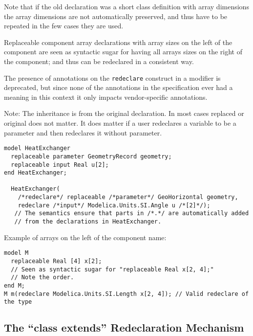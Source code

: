 Note that if the old declaration was a short class definition with array dimensions the array dimensions are not automatically preserved, and thus have to be repeated in the few cases they are used.

Replaceable component array declarations with array sizes on the left of the component are seen as syntactic sugar for having all arrays sizes on the right of the component; and thus can be redeclared in a consistent way.

The presence of annotations on the \lstinline!redeclare! construct in a modifier is deprecated, but since none of the annotations in the specification ever had a meaning in this context it only impacts vendor-specific annotations.

\begin{nonnormative}
Note: The inheritance is from the original declaration.
In most cases replaced or original does not matter.
It does matter if a user redeclares a variable to be a parameter and then redeclares it without parameter.
\end{nonnormative}

\begin{nonnormative}
\begin{lstlisting}[language=modelica]
model HeatExchanger
  replaceable parameter GeometryRecord geometry;
  replaceable input Real u[2];
end HeatExchanger;

  HeatExchanger(
    /*redeclare*/ replaceable /*parameter*/ GeoHorizontal geometry,
    redeclare /*input*/ Modelica.Units.SI.Angle u /*[2]*/);
   // The semantics ensure that parts in /*.*/ are automatically added
   // from the declarations in HeatExchanger.
\end{lstlisting}

Example of arrays on the left of the component name:
\begin{lstlisting}[language=modelica]
model M
  replaceable Real [4] x[2];
  // Seen as syntactic sugar for "replaceable Real x[2, 4];"
  // Note the order.
end M;
M m(redeclare Modelica.Units.SI.Length x[2, 4]); // Valid redeclare of the type
\end{lstlisting}
\end{nonnormative}


\subsection{The ``class extends'' Redeclaration Mechanism}\label{the-class-extends-redeclaration-mechanism}

